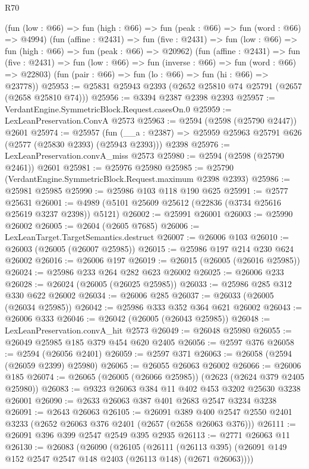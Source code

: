 \begin{lexlean}{R70}
\begin{coremodule}
      (fun (low : @66) => fun (high : @66) => fun (peak : @66) => fun (word : @66) => @4994)
      (fun (affine : @2431) =>
      fun (five : @2431) => fun (low : @66) => fun (high : @66) => fun (peak : @66) => @20962)
      (fun (affine : @2431) =>
      fun (five : @2431) => fun (low : @66) => fun (inverse : @66) => fun (word : @66) => @22803)
      (fun (pair : @66) => fun (lo : @66) => fun (hi : @66) => @23778))
@25953 := @25831 @25943 @2393 (@2652 @25810 @74 @25791 (@2657 (@2658 @25810 @74)))
@25956 := @3394 @2387 @2398 @2393
@25957 := VerdantEngine.SymmetricBlock.Request.casesOn.{0}
@25959 := LexLeanPreservation.ConvA @2573
@25963 := @2594 (@2598 (@25790 @2447)) @2601
@25974 := @25957
    (fun (__a : @2387) => @25959 @25963 @25791 @626 (@2577 (@25830 @2393) (@25943 @2393)))
    @2398
@25976 := LexLeanPreservation.convA_miss @2573
@25980 := @2594 (@2598 (@25790 @2461)) @2601
@25981 := @25976 @25980
@25985 := @25790 (VerdantEngine.SymmetricBlock.Request.maximum @2398 @2393)
@25986 := @25981 @25985
@25990 := @25986 @103 @118 @190 @625
@25991 := @2577 @25631
@26001 := @4989 (@5101 @25609 @25612 (@22836 (@3734 @25616 @25619 @3237 @2398)) @5121)
@26002 := @25991 @26001
@26003 := @25990 @26002
@26005 := @2604 (@2605 @7685)
@26006 := LexLeanTarget.TargetSemantics.destruct
@26007 := @26006 @103
@26010 := @26003 (@26005 (@26007 @25985))
@26015 := @25986 @197 @214 @230 @624 @26002
@26016 := @26006 @197
@26019 := @26015 (@26005 (@26016 @25985))
@26024 := @25986 @233 @264 @282 @623 @26002
@26025 := @26006 @233
@26028 := @26024 (@26005 (@26025 @25985))
@26033 := @25986 @285 @312 @330 @622 @26002
@26034 := @26006 @285
@26037 := @26033 (@26005 (@26034 @25985))
@26042 := @25986 @333 @352 @364 @621 @26002
@26043 := @26006 @333
@26046 := @26042 (@26005 (@26043 @25985))
@26048 := LexLeanPreservation.convA_hit @2573
@26049 := @26048 @25980
@26055 := @26049 @25985 @185 @379 @454 @620 @2405
@26056 := @2597 @376
@26058 := @2594 (@26056 @2401)
@26059 := @2597 @371
@26063 := @26058 (@2594 (@26059 @2399) @25980)
@26065 := @26055 @26063 @26002
@26066 := @26006 @185
@26074 := @26065 (@26005 (@26066 @25985)) (@2623 (@2624 @379 @2405 @25980))
@26083 := @9323 @26063 @384 @11 @402 @453 @3202 @25630 @3238 @26001
@26090 := @2633 @26063 @387 @401 @2683 @2547 @3234 @3238
@26091 := @2643 @26063
@26105 := @26091
    @389
    @400
    @2547
    @2550
    @2401
    @3233
    (@2652 @26063 @376 @2401 (@2657 (@2658 @26063 @376)))
@26111 := @26091 @396 @399 @2547 @2549 @395 @2935
@26113 := @2771 @26063 @11
@26130 := @26083
    (@26090
      (@26105
        (@26111
          (@26113 @395)
          (@26091 @149 @152 @2547 @2547 @148 @2403 (@26113 @148) (@2671 @26063))))

\end{coremodule}
\end{lexlean}
